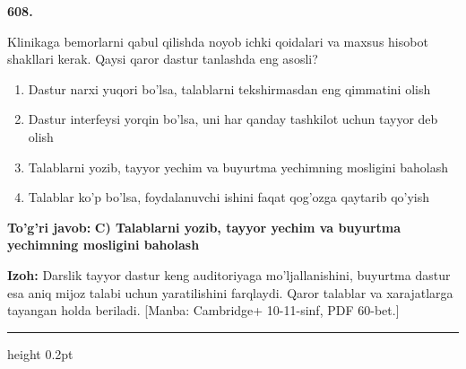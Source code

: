 \documentclass[10pt,a4paper]{article}
\begin{document}
{\bfseries\sffamily\color{ink} 608.}
\par
Klinikaga bemorlarni qabul qilishda noyob ichki qoidalari va maxsus hisobot shakllari kerak. Qaysi qaror dastur tanlashda eng asosli?
\begin{enumerate}[label=\Alph*),leftmargin=9mm]
\item Dastur narxi yuqori bo'lsa, talablarni tekshirmasdan eng qimmatini olish
\item Dastur interfeysi yorqin bo'lsa, uni har qanday tashkilot uchun tayyor deb olish
\item Talablarni yozib, tayyor yechim va buyurtma yechimning mosligini baholash
\item Talablar ko'p bo'lsa, foydalanuvchi ishini faqat qog'ozga qaytarib qo'yish
\end{enumerate}
\begin{tcolorbox}[enhanced,breakable,colback=teal!4,colframe=teal!60!black,boxrule=0.45pt,arc=1.2mm,left=2.7mm,right=2.7mm,top=1.8mm,bottom=1.8mm,before skip=2mm,after skip=2mm]
{\bfseries\sffamily\color{teal}To'g'ri javob:} \textbf{C) Talablarni yozib, tayyor yechim va buyurtma yechimning mosligini baholash}
\par\smallskip
{\bfseries Izoh:} Darslik tayyor dastur keng auditoriyaga mo'ljallanishini, buyurtma dastur esa aniq mijoz talabi uchun yaratilishini farqlaydi. Qaror talablar va xarajatlarga tayangan holda beriladi. [Manba: Cambridge+ 10-11-sinf, PDF 60-bet.]
\end{tcolorbox}
\vspace{2mm}\hrule height 0.2pt\vspace{3mm}
\end{document}
